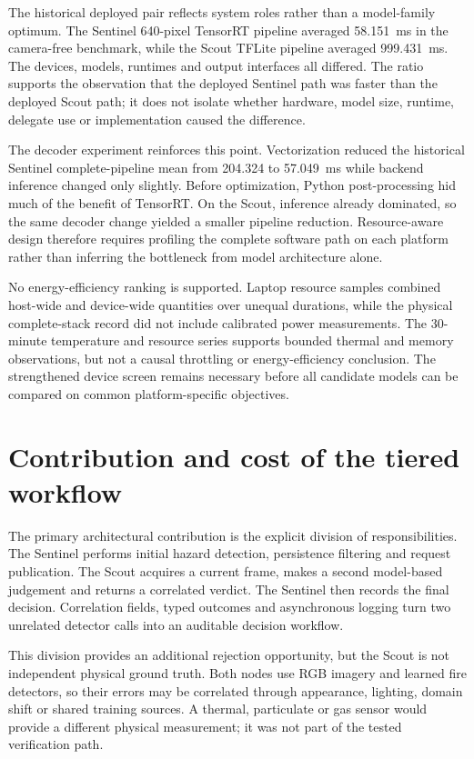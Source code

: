 The historical deployed pair reflects system roles rather than a model-family
optimum. The Sentinel 640-pixel TensorRT pipeline averaged 58.151~ms in the
camera-free benchmark, while the Scout TFLite pipeline averaged 999.431~ms.
The devices, models, runtimes and output interfaces all differed. The ratio
supports the observation that the deployed Sentinel path was faster than the
deployed Scout path; it does not isolate whether hardware, model size, runtime,
delegate use or implementation caused the difference.

The decoder experiment reinforces this point. Vectorization reduced the
historical Sentinel complete-pipeline mean from 204.324 to 57.049~ms while
backend inference changed only slightly. Before optimization, Python
post-processing hid much of the benefit of TensorRT. On the Scout, inference
already dominated, so the same decoder change yielded a smaller pipeline
reduction. Resource-aware design therefore requires profiling the complete
software path on each platform rather than inferring the bottleneck from model
architecture alone.

No energy-efficiency ranking is supported. Laptop resource samples combined
host-wide and device-wide quantities over unequal durations, while the physical
complete-stack record did not include calibrated power measurements. The
30-minute temperature and resource series supports bounded thermal and memory
observations, but not a causal throttling or energy-efficiency conclusion. The
strengthened device screen remains necessary before all candidate models can be
compared on common platform-specific objectives.

\section{Contribution and cost of the tiered workflow}
\label{sec:discussion:3}

The primary architectural contribution is the explicit division of
responsibilities. The Sentinel performs initial hazard detection, persistence
filtering and request publication. The Scout acquires a current frame, makes a
second model-based judgement and returns a correlated verdict. The Sentinel
then records the final decision. Correlation fields, typed outcomes and
asynchronous logging turn two unrelated detector calls into an auditable
decision workflow.

This division provides an additional rejection opportunity, but the Scout is
not independent physical ground truth. Both nodes use RGB imagery and learned
fire detectors, so their errors may be correlated through appearance, lighting,
domain shift or shared training sources. A thermal, particulate or gas sensor
would provide a different physical measurement; it was not part of the tested
verification path.

